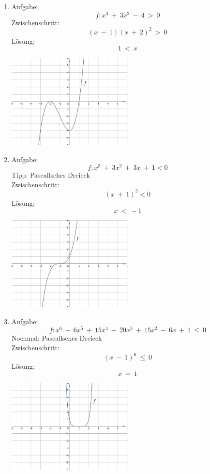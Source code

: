\begin{enumerate}
\begin{center}
					\end{center}
	\item Aufgabe:
					\[f : x^3 \ + \ 3x^2 \ - \ 4 \ > \ 0\]
				Zwischenschritt:
					\[(x \ - \ 1)(x \ + \ 2)^2 \ > \ 0\]
				L\"osung:	
					\[1 \ < \ x\]
					\begin{center}
						\includegraphics[width=0.5\textwidth]{img/Aufgaben/Analytisch/A4.PNG}
					\end{center}
	\item Aufgabe:
					\[f : x^3 \ + \ 3x^2 \ + \ 3x \ + \ 1 < 0\]
				Tipp: Pascallsches Dreieck \\
				Zwischenschritt:
					\[(x \ + \ 1)^3 < 0\]
				L\"osung:
					\[x \ < \ -1\]
					\begin{center}
						\includegraphics[width=0.5\textwidth]{img/Aufgaben/Analytisch/A5.PNG}
					\end{center}
	\item Aufgabe:
					\[f : x^6 \ - \ 6x^5 \ + \ 15x^4 \ - \ 20x^3 \ + \ 15x^2 \ - \ 6x \ + \ 1 \ \leq \ 0\]
				Nochmal: Pascallsches Dreieck \\
				Zwischenschritt:
					\[(x \ - \ 1)^6 \ \leq \ 0\]
				L\"osung:
					\[x \ = \ 1\]
					\begin{center}
						\includegraphics[width=0.5\textwidth]{img/Aufgaben/Analytisch/A6.PNG}

\end{center}
\end{enumerate}

